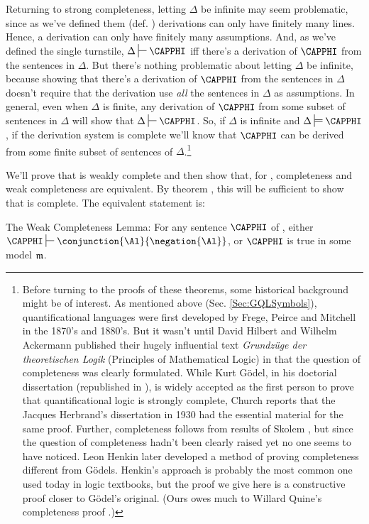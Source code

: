 Returning to strong completeness, letting $\Delta$ be infinite may seem problematic, since as we've defined them (def. ) derivations can only have finitely many lines. 
Hence, a derivation can only have finitely many assumptions. 
And, as we've defined the single turnstile, $\Delta\sststile{}{}\CAPPHI$ iff there's a derivation of $\CAPPHI$ from the sentences in $\Delta$. 
But there's nothing problematic about letting $\Delta$ be infinite, because showing that there's a derivation of $\CAPPHI$ from the sentences in $\Delta$ doesn't require that the derivation use \emph{all} the sentences in $\Delta$ as assumptions. 
In general, even when $\Delta$ is finite, any derivation of $\CAPPHI$ from some subset of sentences in $\Delta$ will show that $\Delta\sststile{}{}\CAPPHI$. 
So, if $\Delta$ is infinite and $\Delta\sdtstile{}{}\CAPPHI$, if the derivation system  is complete we'll know that $\CAPPHI$ can be derived from some finite subset of sentences of $\Delta$.\footnote{Before turning to the proofs of these theorems, some historical background might be of interest. 
	As mentioned above (Sec. \ref{Sec:GQLSymbols}), quantificational languages were first developed by Frege, Peirce and Mitchell in the 1870's and 1880's. 
	But it wasn't until David Hilbert and Wilhelm Ackermann published their hugely influential text \emph{Grundz\"uge der theoretischen Logik} (Principles of Mathematical Logic) in \citeyear{Hilbert1928} that the question of completeness was clearly formulated. 
	While Kurt G\"odel, in his \citeyear{Godel1929} doctorial dissertation (republished in \citeyear{Godel1930}), is widely accepted as the first person to prove that quantificational logic is strongly complete, Church \citeyearpar[291,~fn.464]{Church1956} reports that the Jacques Herbrand's dissertation in 1930 had the essential material for the same proof.  
	Further, completeness follows from results of Skolem \citeyearpar{Skolem1928}, but since the question of completeness hadn't been clearly raised yet no one seems to have noticed. 
	Leon Henkin \citeyearpar{Henkin1949} later developed a method of proving completeness different from G\"odels. 
	Henkin's approach is probably the most common one used today in logic textbooks, but the proof we give here is a constructive proof closer to G\"odel's original.
	(Ours owes much to Willard Quine's completeness proof \citeyearpar{Quine1982}.)}



We'll prove that \GSD{} is weakly complete and then show that, for \GSD{}, completeness and weak completeness are equivalent. 
By theorem , this will be sufficient to show that \GSD{} is complete.
The equivalent statement is:
\begin{THEOREM}{ The \GSD{} Weak Completeness Lemma:}
For any sentence $\CAPPHI$ of \GSD{}, either $\CAPPHI\sststile{}{}\conjunction{\Al}{\negation{\Al}}$, or $\CAPPHI$ is true in some model $\mathfrak{m}$.
\end{THEOREM}

